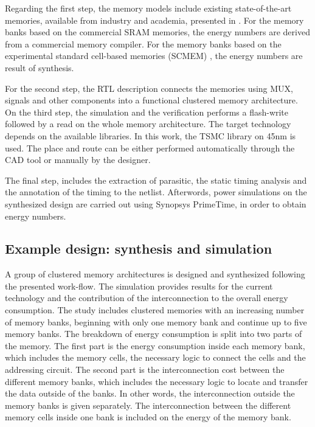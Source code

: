 \documentclass[12pt,a4paper]{article}
\begin{document}
Regarding the first step, the memory models include existing state-of-the-art memories, available from industry and academia, presented in \cite{filippopoulos2013exploration}.
For the memory banks based on the commercial SRAM memories, the energy numbers are derived from a commercial memory compiler.
For the memory banks based on the experimental standard cell-based memories (SCMEM) \cite{Mei11},  the energy numbers are result of synthesis.

For the second step, the RTL description connects the memories using MUX, signals and other components into a functional clustered memory architecture. 
On the third step, the simulation and the verification performs a flash-write followed by a read on the whole memory architecture. 
The target technology depends on the available libraries.
In this work, the TSMC library on 45nm is used.
The place and route can be either performed automatically through the CAD tool or manually by the designer.

The final step, includes the extraction of  parasitic, the static timing analysis and the annotation of the timing to the netlist.
Afterwords, power simulations on the synthesized design are carried out using Synopsys PrimeTime, in order to obtain energy numbers.

\subsection{Example design: synthesis and simulation}

A group of clustered memory architectures is designed and synthesized following the presented work-flow.
The simulation provides results for the current technology and the contribution of the interconnection to the overall energy consumption.
The study includes clustered memories with an increasing number of memory banks, beginning with only one memory bank and continue up to five memory banks.
The breakdown of energy consumption is split into two parts of the memory.
The first part is the energy consumption inside each memory bank, which includes the memory cells, the necessary logic to connect the cells and the addressing circuit.
The second part is the interconnection cost between the different memory banks, which includes the necessary logic to locate and transfer the data outside of the banks. 
In other words, the interconnection outside the memory banks is given separately. 
The interconnection between the different memory cells inside one bank is included on the energy of the memory bank.
\end{document}

